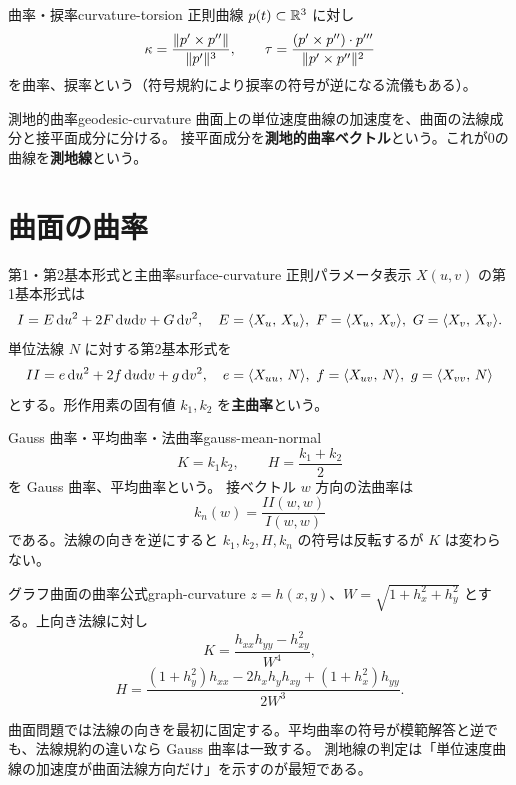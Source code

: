 \begin{definition}{曲率・捩率}{curvature-torsion}
正則曲線 $p(t)\subset\mathbb{R}^3$ に対し
\[
 \kappa=\frac{\lVert p'\times p'' \rVert}{\lVert p' \rVert^3},
 \qquad
 \tau=\frac{(p'\times p'')\cdot p'''}{\lVert p'\times p'' \rVert^2}
\]
を曲率、捩率という（符号規約により捩率の符号が逆になる流儀もある）。
\end{definition}

\begin{definition}{測地的曲率}{geodesic-curvature}
曲面上の単位速度曲線の加速度を、曲面の法線成分と接平面成分に分ける。
接平面成分を\textbf{測地的曲率ベクトル}という。これが0の曲線を\textbf{測地線}という。
\end{definition}

\section{曲面の曲率}

\begin{definition}{第1・第2基本形式と主曲率}{surface-curvature}
正則パラメータ表示 $X(u,v)$ の第1基本形式は
\[
 I=E\,\d u^2+2F\,\d u\d v+G\,\d v^2,
 \quad E=\inner{X_u}{X_u},\ F=\inner{X_u}{X_v},\ G=\inner{X_v}{X_v}.
\]
単位法線 $N$ に対する第2基本形式を
\[
 II=e\,\mathrm{d} u^2+2f\,\mathrm{d} u\mathrm{d} v+g\,\mathrm{d} v^2,
 \quad e=\langle X_{uu},\, N \rangle,\ f=\langle X_{uv},\, N \rangle,\ g=\langle X_{vv},\, N \rangle
\]
とする。形作用素の固有値 $k_1,k_2$ を\textbf{主曲率}という。
\end{definition}

\begin{definition}{Gauss 曲率・平均曲率・法曲率}{gauss-mean-normal}
\[
 K=k_1k_2,\qquad H=\frac{k_1+k_2}{2}
\]
を Gauss 曲率、平均曲率という。
接ベクトル $w$ 方向の法曲率は
\[
 k_n(w)=\frac{II(w,w)}{I(w,w)}
\]
である。法線の向きを逆にすると $k_1,k_2,H,k_n$ の符号は反転するが $K$ は変わらない。
\end{definition}

\begin{proposition}{グラフ曲面の曲率公式}{graph-curvature}
$z=h(x,y)$、$W=\sqrt{1+h_x^2+h_y^2}$ とする。上向き法線に対し
\[
 K=\frac{h_{xx}h_{yy}-h_{xy}^2}{W^4},
\]
\[
 H=\frac{(1+h_y^2)h_{xx}-2h_xh_yh_{xy}+(1+h_x^2)h_{yy}}{2W^3}.
\]
\end{proposition}

\begin{memo*}
曲面問題では法線の向きを最初に固定する。平均曲率の符号が模範解答と逆でも、法線規約の違いなら Gauss 曲率は一致する。
測地線の判定は「単位速度曲線の加速度が曲面法線方向だけ」を示すのが最短である。
\end{memo*}
